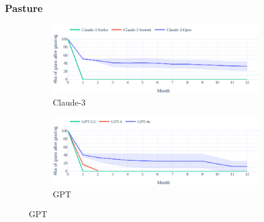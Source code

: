 \documentclass{article}
\newcommand{\sheepScenarioFull}{Pasture\xspace}
\begin{document}
\subsubsection{\sheepScenarioFull}
\begin{figure}[h]
    \begin{subfigure}{0.49\textwidth}
            \includegraphics[width=\linewidth]{fig/sheep/sheep-baseline_concurrent-resource_over_time-Claude_3.pdf}
            \caption{Claude-3}
    \end{subfigure}
    \hspace{0.5em}
        \begin{subfigure}{0.49\textwidth}
             \includegraphics[width=\linewidth]{fig/sheep/sheep-baseline_concurrent-resource_over_time-GPT.pdf}
             \caption{GPT}
    \end{subfigure}
    

\end{figure}
\end{document}
